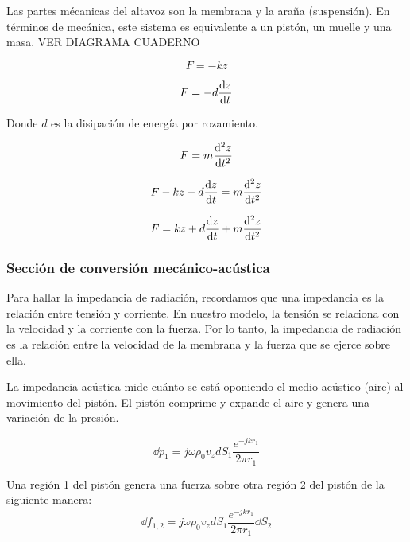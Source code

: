 \documentclass[12pt, a4paper]{article}
\begin{document}
Las partes mécanicas del altavoz son la membrana y la araña (suspensión). En términos de mecánica, este sistema es equivalente a un pistón, un muelle y una masa. VER DIAGRAMA CUADERNO

\begin{equation} \label{eq:ley_hooke}
    F = -kz
\end{equation}

\begin{equation} \label{eq:amortiguamiento}
    F = -d \dv{z}{t}
\end{equation}

Donde $d$ es la disipación de energía por rozamiento.

\begin{equation} \label{eq:masa}
    F = m \dv[2]{z}{t}
\end{equation}

\begin{equation} \label{eq:ecuacion_seccion_mecanica}
    F - k z - d \dv{z}{t} = m \dv[2]{z}{t}
\end{equation}

\begin{equation} \label{eq:ecuacion_seccion_mecanica_2}
    F = kz + d \dv{z}{t} + m \dv[2]{z}{t}
\end{equation}

\subsubsection{Sección de conversión mecánico-acústica}

Para hallar la impedancia de radiación, recordamos que una impedancia es la relación entre tensión y corriente. En nuestro modelo, la tensión se relaciona con la velocidad y la corriente con la fuerza. Por lo tanto, la impedancia de radiación es la relación entre la velocidad de la membrana y la fuerza que se ejerce sobre ella.

La impedancia acústica mide cuánto se está oponiendo el medio acústico (aire) al movimiento del pistón. El pistón comprime y expande el aire y genera una variación de la presión.

\begin{equation} \label{eq:incremento_presion}
    \dd p_1 = j\omega\rho_0 v_z d S_1 \frac{e^{-jkr_1}}{2\pi r_1}
\end{equation}

Una región 1 del pistón genera una fuerza sobre otra región 2 del pistón de la siguiente manera: 
\begin{equation} \label{eq:presion_de_1_sobre_2}
    \dd f_{1,2} = j\omega \rho_0 v_z d S_1 \frac{e^{-jkr_1}}{2\pi r_1} \dd S_2
\end{equation}
\end{document}
